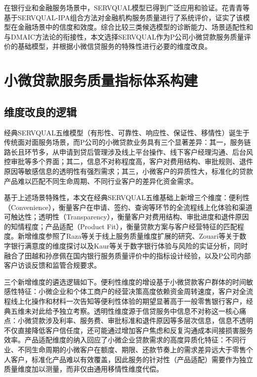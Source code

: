 在银行业和金融服务场景中，SERVQUAL模型已得到广泛应用和验证。花青青等基于SERVQUAL-IPA组合方法对金融机构服务质量进行了系统评价，证实了该模型在金融场景中的信度和效度\cite{ref15}。综合比较三类候选模型的诊断能力、场景适配性和与DMAIC方法论的衔接性，本文选择SERVQUAL作为P公司小微贷款服务质量评价的基础模型，并根据小微信贷服务的特殊性进行必要的维度改良。\par

\section{小微贷款服务质量指标体系构建}

\subsection{维度改良的逻辑}

经典SERVQUAL五维模型（有形性、可靠性、响应性、保证性、移情性）诞生于传统面对面服务场景，而P公司的小微贷款业务具有三个显著差异：其一，服务链路长且环节多，从申请到贷后管理涉及线上平台操作、线下客户经理沟通、后台风控审批等多个界面；其二，信息不对称程度高，客户对费用结构、审批规则、退件原因等敏感信息的透明性有强烈需求；其三，小微客户的异质性大，标准化的贷款产品难以匹配不同生命周期、不同行业客户的差异化资金需求。\par

基于上述场景特殊性，本文在经典SERVQUAL五维基础上新增三个维度：便利性（Convenience），衡量客户在申请、签约、查询等环节的全流程线上化体验和渠道可触达性；透明性（Transparency），衡量客户对费用结构、审批进度和退件原因的知情程度；产品适配（Product Fit），衡量贷款方案与客户经营特征的匹配程度。新增维度参照了Raza等关于线上服务质量维度扩展的研究\cite{ref43}、Zouari等关于数字银行满意度的维度探讨\cite{ref39}以及Kaur等关于数字银行体验与风险的实证分析\cite{ref40}，同时融合了田越\cite{ref44}和孙彦佩\cite{ref37}在国内银行服务质量评价中的指标设计经验，以及P公司内部客户访谈反馈和监管合规要求。\par

三个新增维度的遴选逻辑如下。便利性维度的增设基于小微贷款客户群体的时间敏感性特征：小微企业和个体工商户的经营决策高度依赖资金周转速度，客户对全流程线上化操作和材料一次告知等便利性体验的期望显著高于一般零售银行客户，经典五维未对此给予独立考察。透明性维度源于信贷服务中信息不对称这一核心痛点：小微贷款涉及利率、服务费、审批标准和退件原因等多层次信息，信息不透明不仅直接降低客户信任度，还可能通过增加客户焦虑和反复沟通成本间接损害服务效率。产品适配维度的纳入回应了小微企业贷款需求的高度异质化特征：不同行业、不同生命周期的小微客户在额度、期限、还款节奏上的需求差异远大于零售个人客户，标准化产品难以有效覆盖，因此服务的针对性（产品适配）需要作为独立质量维度加以测量，而非仅由通用移情性维度代偿。\par

